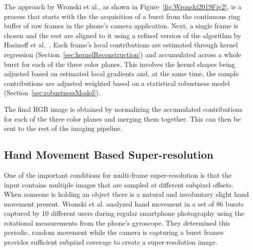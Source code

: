 \documentclass{sig-alternate}
\begin{document}

The approach by Wronski et al., as shown in Figure~\ref{fig:Wronski2019Fig2}, is a process that starts with the the acquisition of a burst from the continuous ring buffer of raw frames in the phone's camera application. Next, a single frame is chosen and the rest are aligned to it using a refined version of the algorithm by Hasinoff et al.~\cite{Hasinoff2016}.
Each frame's local contributions are estimated through kernel regression (Section~\ref{sec:kernelReconstruction}) and accumulated across a whole burst for each of the three color planes. This involves the kernel shapes being adjusted based on estimated local gradients and, at the same time, the sample contributions are adjusted weighted based on a statistical robustness model (Section~\ref{sec:robustnessModel}).


The final RGB image is obtained by normalizing the accumulated contributions for each of the three color planes and merging them together. This can then be sent to the rest of the imaging pipeline.

\subsection{Hand Movement Based Super-resolution}

One of the important conditions for multi-frame super-resolution is that the input contains multiple images that are sampled at different subpixel offsets. When someone is holding an object there is a natural and involuntary slight hand movement present. Wronski et al. analyzed hand movement in a set of 86 bursts captured by 10 different users during regular smartphone photography using the rotational measurements from the phone's gyroscope. They determined this periodic, random movement while the camera is capturing a burst frames provides sufficient subpixel coverage to create a super-resolution image.

\end{document}
